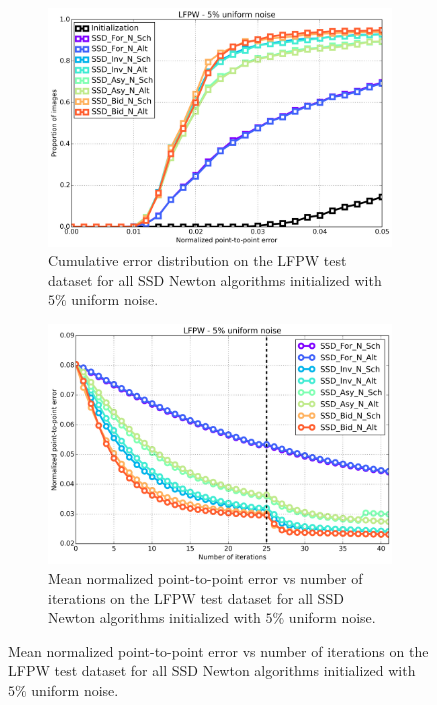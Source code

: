 \begin{figure}[p]
	\centering
	\begin{subfigure}{0.48\textwidth}
	    \includegraphics[width=\textwidth]{experiments/algorithms/ssd_n/ced_ssd_n_5.png}
	    \caption{Cumulative error distribution on the LFPW test dataset for all SSD Newton algorithms initialized with $5\%$ uniform noise.}
	    \label{fig:ced_ssd_n_5}
	\end{subfigure}
	\hfill
	\begin{subfigure}{0.48\textwidth}
	    \includegraphics[width=\textwidth]{experiments/algorithms/ssd_n/mean_error_vs_iters_ssd_n_5.png}
	    \caption{Mean normalized point-to-point error vs number of iterations on the LFPW test dataset for all SSD Newton algorithms initialized with $5\%$ uniform noise.}
	    \label{fig:mean_error_vs_iters_ssd_n_5}
	\end{subfigure}

\end{figure}
